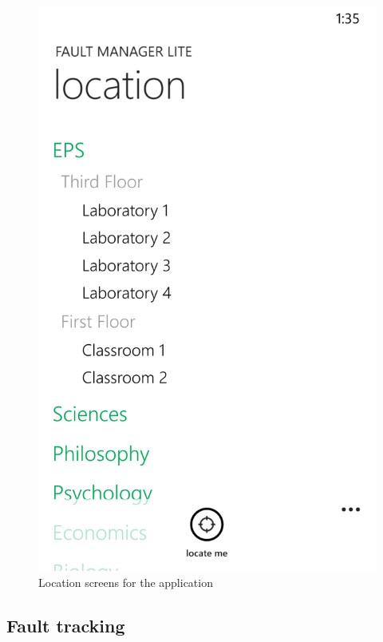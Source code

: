 \documentclass{report}
\begin{document}
\begin{figure}[hbtp]
\begin{minipage}{0.3\textwidth}
\end{minipage}
\hspace{0.02\textwidth}
\begin{minipage}{0.3\textwidth}
\includegraphics[width=\textwidth]{img/Location.png}
\end{minipage}
\caption{Location screens for the application}
\label{imgLocation}
\end{figure}

\subsection{Fault tracking}
\end{document}
